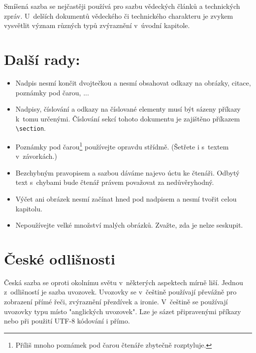 \documentclass[twocolumn,a4paper,10pt]{article}
\begin{document}
Smíšená sazba se nejčastěji používá pro sazbu vědeckých článků a technických zpráv.
U~delších dokumentů vědeckého či technického charakteru je zvykem vysvětlit význam různých typů zvýraznění v~úvodní kapitole.


\section{Další rady:}
\label{sec:dalsi_rady}

\begin{itemize}
\item Nadpis nesmí končit dvojtečkou a nesmí obsahovat odkazy na obrázky, citace, poznámky pod čarou, ...

\item Nadpisy, číslování a odkazy na číslované elementy musí být sázeny příkazy k~tomu určenými.
Číslování sekcí tohoto dokumentu je zajištěno příkazem \verb|\section|.

\item Poznámky pod čarou\footnote[1]{Příliš mnoho poznámek pod čarou čtenáře zbytečně rozptyluje.} používejte opravdu střídmě.
(Šetřete i s~textem v~závorkách.)

\item Bezchybným pravopisem a sazbou dáváme najevo úctu ke čtenáři.
Odbytý text s~chybami bude čtenář právem považovat za nedůvěryhodný.

\item Výčet ani obrázek nesmí začínat hned pod nadpisem a nesmí tvořit celou kapitolu.

\item Nepoužívejte velké množství malých obrázků.
Zvažte, zda je nelze seskupit.

\end{itemize}


\section{České odlišnosti}

Česká sazba se oproti okolnímu světu v~některých aspektech mírně liší.
Jednou z~odlišností je sazba uvozovek.
Uvozovky se v~češtině používají převážně pro zobrazení přímé řeči, zvýraznění přezdívek a ironie.
V~češtině se používají uvozovky typu  místo "anglických uvozovek".
Lze je sázet připravenými příkazy nebo při použití UTF-8 kódování i přímo.
\end{document}
